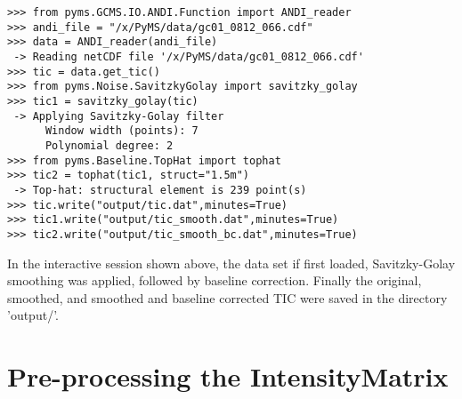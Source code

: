 \begin{verbatim}
>>> from pyms.GCMS.IO.ANDI.Function import ANDI_reader
>>> andi_file = "/x/PyMS/data/gc01_0812_066.cdf"
>>> data = ANDI_reader(andi_file)
 -> Reading netCDF file '/x/PyMS/data/gc01_0812_066.cdf'
>>> tic = data.get_tic()
>>> from pyms.Noise.SavitzkyGolay import savitzky_golay
>>> tic1 = savitzky_golay(tic)
 -> Applying Savitzky-Golay filter
      Window width (points): 7
      Polynomial degree: 2
>>> from pyms.Baseline.TopHat import tophat
>>> tic2 = tophat(tic1, struct="1.5m")
 -> Top-hat: structural element is 239 point(s)
>>> tic.write("output/tic.dat",minutes=True)
>>> tic1.write("output/tic_smooth.dat",minutes=True)
>>> tic2.write("output/tic_smooth_bc.dat",minutes=True)
\end{verbatim}

\noindent
In the interactive session shown above, the data set if first loaded,
Savitzky-Golay smoothing was applied, followed by baseline correction.
Finally the original, smoothed, and smoothed and baseline corrected
TIC were saved in the directory 'output/'.

\section{Pre-processing the IntensityMatrix}




